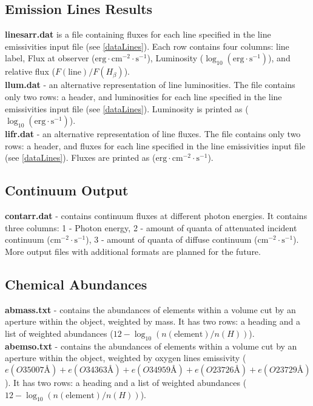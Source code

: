 \documentclass[a4paper]{article}
\begin{document}
\subsection{Emission Lines Results}
{\bf linesarr.dat} is a file containing fluxes for each line specified in the line emissivities input file (see \ref{dataLines}).
Each row contains four columns: line label, Flux at observer ($\mathrm{erg} \cdot \mathrm{cm}^{-2} \cdot \mathrm{s}^{-1}$), Luminosity ($\log_{10}(\mathrm{erg} \cdot \mathrm{s}^{-1})$),
and relative flux ($F(\text{line})/F(H_{\beta})$).\\
{\bf llum.dat} - an alternative representation of line luminosities. The file contains only two rows: a header, and luminosities for each line specified in the line emissivities input file (see \ref{dataLines}).
Luminosity is printed as ($\log_{10}(\mathrm{erg} \cdot \mathrm{s}^{-1})$). \\
{\bf lifr.dat} - an alternative representation of line fluxes. The file contains only two rows: a header, and fluxes for each line specified in the line emissivities input file (see \ref{dataLines}).
Fluxes are printed as ($\mathrm{erg} \cdot \mathrm{cm}^{-2} \cdot \mathrm{s}^{-1}$).

\subsection{Continuum Output}
{\bf contarr.dat} - contains continuum fluxes at different photon energies. It contains three columns:
1 - Photon energy, 2 - amount of quanta of attenuated incident continuum ($\mathrm{cm}^{-2} \cdot \mathrm{s}^{-1}$), 3 - amount of quanta of diffuse continuum ($\mathrm{cm}^{-2} \cdot \mathrm{s}^{-1}$).\\

More output files with additional formats are planned for the future.

\subsection{Chemical Abundances}
{\bf abmass.txt} - contains the abundances of elements within a volume cut by an aperture within the object, weighted by mass.
It has two rows: a heading and a list of weighted abundances ($12 - \log_{10}(n(\text{element})/n(H))$). \\
{\bf abemso.txt} - contains the abundances of elements within a volume cut by an aperture within the object, weighted by oxygen
lines emissivity ($e(O3  5007\text{\AA}) + e(O3  4363\text{\AA}) + e(O3  4959\text{\AA}) + e(O2  3726\text{\AA}) + e(O2  3729\text{\AA})$).
It has two rows: a heading and a list of weighted abundances ($12 - \log_{10}(n(\text{element})/n(H))$).
\end{document}
